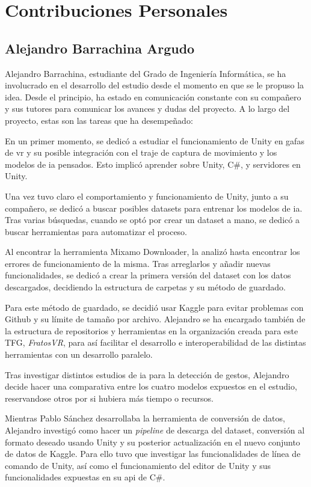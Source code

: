 \chapter*{Contribuciones Personales}
\label{cap:contribucionesPersonales}

\section*{Alejandro Barrachina Argudo}
Alejandro Barrachina, estudiante del Grado de Ingeniería Informática, se ha involucrado en el desarrollo del estudio desde el momento en que se le propuso la idea. Desde el principio, ha estado en comunicación constante con su compañero y sus tutores para comunicar los avances y dudas del proyecto. A lo largo del proyecto, estas son las tareas que ha desempeñado:

En un primer momento, se dedicó a estudiar el funcionamiento de Unity en gafas de \gls{vr} y su posible integración con el traje de captura de movimiento y los modelos de \gls{ia} pensados. Esto implicó aprender sobre Unity, C\#, y servidores en Unity.

Una vez tuvo claro el comportamiento y funcionamiento de Unity, junto a su compañero, se dedicó a buscar posibles datasets para entrenar los modelos de \gls{ia}. Tras varias búsquedas, cuando se optó por crear un dataset a mano, se dedicó a buscar herramientas para automatizar el proceso.

Al encontrar la herramienta Mixamo Downloader, la analizó hasta encontrar los errores de funcionamiento de la misma. Tras arreglarlos y añadir nuevas funcionalidades, se dedicó a crear la primera versión del dataset con los datos descargados, decidiendo la estructura de carpetas y su método de guardado.

Para este método de guardado, se decidió usar Kaggle para evitar problemas con Github y su límite de tamaño por archivo. Alejandro se ha encargado también de la estructura de repositorios y herramientas en la organización creada para este TFG, \textit{FratosVR}, para así facilitar el desarrollo e interoperabilidad de las distintas herramientas con un desarrollo paralelo.

Tras investigar distintos estudios de \gls{ia} para la detección de gestos, Alejandro decide hacer una comparativa entre los cuatro modelos expuestos en el estudio, reservandose otros por si hubiera más tiempo o recursos.

Mientras Pablo Sánchez desarrollaba la herramienta de conversión de datos, Alejandro investigó como hacer un \textit{pipeline} de descarga del dataset, conversión al formato deseado usando Unity y su posterior actualización en el nuevo conjunto de datos de Kaggle. Para ello tuvo que investigar las funcionalidades de línea de comando de Unity, así como el funcionamiento del editor de Unity y sus funcionalidades expuestas en su \gls{api} de C\#.

